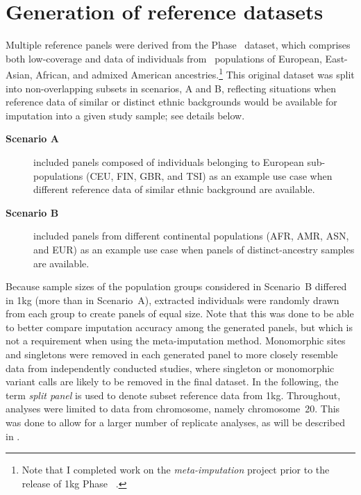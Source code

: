 %
\section{Generation of reference datasets}
\label{metaimpute_data}
%

Multiple reference panels were derived from the  Phase~ dataset, which comprises both low-coverage  and  data of  individuals from ~populations of European, East-Asian, African, and admixed American ancestries.\footnote{Note that I completed work on the \emph{meta-imputation} project prior to the release of \gls{1kg} Phase~ \mbox{\citep{Auton:2015gk}}.}
This original dataset was split into non-overlapping subsets in  scenarios, A and B, reflecting situations when reference data of similar or distinct ethnic backgrounds would be available for imputation into a given study sample; see details below.
\begin{description}
	\item[\textbf{Scenario A}] included  panels composed of individuals belonging to European sub-populations (CEU, FIN, GBR, and TSI) as an example use case when different reference data of similar ethnic background are available.
	\item[\textbf{Scenario B}] included  panels from different continental populations (AFR, AMR, ASN, and EUR) as an example use case when panels of distinct-ancestry samples are available.
\end{description}
Because sample sizes of the population groups considered in Scenario~B differed in \gls{1kg} (more than in Scenario~A), extracted individuals were randomly drawn from each group to create panels of equal size.
Note that this was done to be able to better compare imputation accuracy among the generated panels, but which is not a requirement when using the meta-imputation method.
Monomorphic sites and singletons were removed in each generated panel to more closely resemble data from independently conducted studies, where singleton or monomorphic variant calls are likely to be removed in the final dataset.
In the following, the term \emph{split panel} is used to denote subset reference data from \gls{1kg}.
Throughout, analyses were limited to data from  chromosome, namely chromosome~20.
This was done to allow for a larger number of replicate analyses, as will be described in .


%

%


